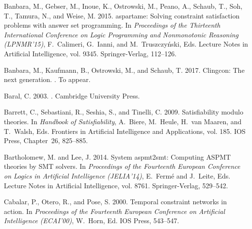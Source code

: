 \begin{thebibliography}{}

{\sc Banbara, M.}, {\sc Gebser, M.}, {\sc Inoue, K.}, {\sc Ostrowski, M.}, {\sc
  Peano, A.}, {\sc Schaub, T.}, {\sc Soh, T.}, {\sc Tamura, N.}, {\sc and} {\sc
  Weise, M.} 2015.
\newblock aspartame: Solving constraint satisfaction problems with answer set
  programming.
\newblock In {\em Proceedings of the Thirteenth International Conference on
  Logic Programming and Nonmonotonic Reasoning (LPNMR'15)}, {F.~Calimeri},
  {G.~Ianni}, {and} {M.~Truszczy{\'n}ski}, Eds. Lecture Notes in Artificial
  Intelligence, vol. 9345. Springer-Verlag, 112--126.

{\sc Banbara, M.}, {\sc Kaufmann, B.}, {\sc Ostrowski, M.}, {\sc and} {\sc
  Schaub, T.} 2017.
\newblock Clingcon: The next generation.
.
\newblock To appear.

{\sc Baral, C.} 2003.
.
\newblock Cambridge University Press.

{\sc Barrett, C.}, {\sc Sebastiani, R.}, {\sc Seshia, S.}, {\sc and} {\sc
  Tinelli, C.} 2009.
\newblock Satisfiability modulo theories.
\newblock In {\em Handbook of Satisfiability}, {A.~Biere}, {M.~Heule}, {H.~{van
  Maaren}}, {and} {T.~Walsh}, Eds. Frontiers in Artificial Intelligence and
  Applications, vol. 185. IOS Press, Chapter~26, 825--885.

{\sc Bartholomew, M.} {\sc and} {\sc Lee, J.} 2014.
\newblock System aspmt2smt: Computing {ASPMT} theories by {SMT} solvers.
\newblock In {\em Proceedings of the Fourteenth European Conference on Logics
  in Artificial Intelligence (JELIA'14)}, {E.~Ferm\'{e}} {and} {J.~Leite}, Eds.
  Lecture Notes in Artificial Intelligence, vol. 8761. Springer-Verlag,
  529--542.

{\sc Cabalar, P.}, {\sc Otero, R.}, {\sc and} {\sc Pose, S.} 2000.
\newblock Temporal constraint networks in action.
\newblock In {\em Proceedings of the Fourteenth European Conference on
  Artificial Intelligence (ECAI'00)}, {W.~Horn}, Ed. IOS Press, 543--547.


\end{thebibliography}
